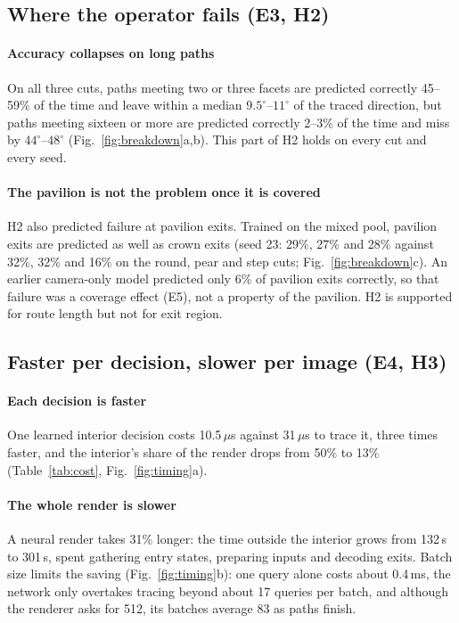 \documentclass[conference]{IEEEtran}
\newcommand{\dg}{^{\circ}}
\begin{document}
\subsection{Where the operator fails (E3, H2)}

\paragraph{Accuracy collapses on long paths} On all three cuts, paths meeting
two or three facets are predicted correctly 45--59\% of the time and leave
within a median $9.5\dg$--$11\dg$ of the traced direction, but paths meeting
sixteen or more are predicted correctly 2--3\% of the time and miss by
$44\dg$--$48\dg$ (Fig.~\ref{fig:breakdown}a,b). This part of H2 holds on every
cut and every seed.

\paragraph{The pavilion is not the problem once it is covered} H2 also
predicted failure at pavilion exits. Trained on the mixed pool, pavilion exits
are predicted as well as crown exits (seed 23: 29\%, 27\% and 28\% against 32\%,
32\% and 16\% on the round, pear and step cuts; Fig.~\ref{fig:breakdown}c). An
earlier camera-only model predicted only 6\% of pavilion exits correctly, so that
failure was a coverage effect (E5), not a property of the pavilion. H2 is
supported for route length but not for exit region.

\subsection{Faster per decision, slower per image (E4, H3)}
\label{sec:cost}

\paragraph{Each decision is faster} One learned interior decision costs
10.5\,$\mu$s against 31\,$\mu$s to trace it, three times faster, and the
interior's share of the render drops from 50\% to 13\% (Table~\ref{tab:cost},
Fig.~\ref{fig:timing}a).

\paragraph{The whole render is slower} A neural render takes 31\% longer: the
time outside the interior grows from 132\,s to 301\,s, spent gathering entry
states, preparing inputs and decoding exits. Batch size limits the saving
(Fig.~\ref{fig:timing}b): one query alone costs about 0.4\,ms, the network only
overtakes tracing beyond about 17 queries per batch, and although the renderer
asks for 512, its batches average 83 as paths finish.
\end{document}
